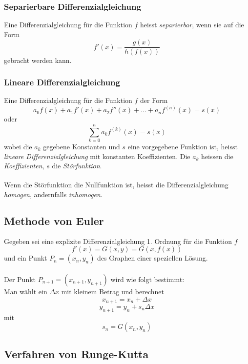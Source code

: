 \documentclass[10pt,a4paper]{scrartcl}
\begin{document}
\subsubsection{Separierbare Differenzialgleichung}

Eine Differenzialgleichung für die Funktion $f$ heisst
\textit{separierbar}, wenn sie auf die Form
$$f'(x) = \frac{g(x)}{h(f(x))}$$
gebracht werden kann.


\subsubsection{Lineare Differenzialgleichung}

Eine Differenzialgleichung für die Funktion $f$ der Form
$$a_0 f(x) + a_1 f'(x) + a_2 f''(x) + \dots + a_n f^{(n)}(x) = s(x)$$
oder
$$\sum\limits_{k=0}^n a_k f^{(k)}(x) = s(x)$$
wobei die $a_k$ gegebene Konstanten und $s$ eine vorgegebene
Funktion ist, heisst \textit{lineare Differenzialgleichung}
mit konstanten Koeffizienten. Die $a_k$ heissen die
\textit{Koeffizienten}, $s$ die \textit{Störfunktion}.\\\\
Wenn die Störfunktion die Nullfunktion ist, heisst die
Differenzialgleichung \textit{homogen}, andernfalls
\textit{inhomogen}.


\subsection{Methode von Euler}

Gegeben sei eine explizite Differenzialgleichung 1. Ordnung für die Funktion $f$
$$f'(x) = G(x, y) = G(x,f(x))$$
und ein Punkt $P_n = (x_n,y_n)$ des Graphen einer speziellen Lösung.\\\\
Der Punkt $P_{n+1} = (x_{n+1}, y_{n+1})$ wird wie folgt bestimmt:\\
Man wählt ein $\Delta{x}$ mit kleinem Betrag und berechnet
$$x_{n+1} = x_n + \Delta x$$
$$y_{n+1} = y_n + s_n\Delta x$$
mit
$$s_n = G(x_n,y_n)$$


\subsection{Verfahren von Runge-Kutta}
\end{document}
